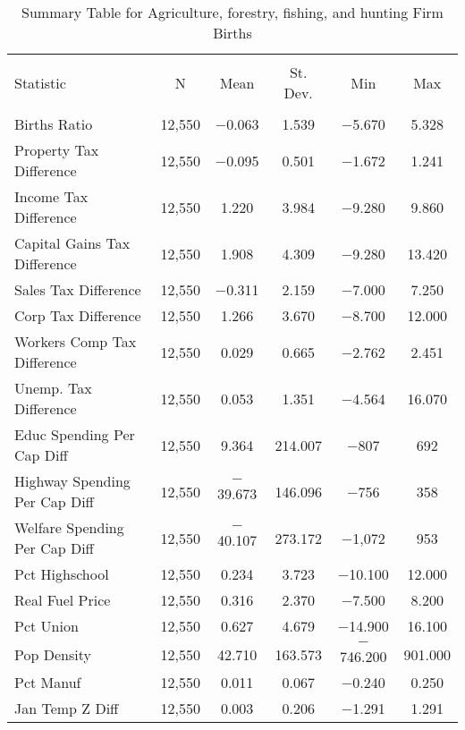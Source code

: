 
\begin{table}[!htbp] \centering 
  \caption{Summary Table for  Agriculture, forestry, fishing, and hunting Firm Births} 
  \label{11summary} 
\begin{tabular}{@{\extracolsep{5pt}}lccccc} 
\\[-1.8ex]\hline 
\hline \\[-1.8ex] 
Statistic & \multicolumn{1}{c}{N} & \multicolumn{1}{c}{Mean} & \multicolumn{1}{c}{St. Dev.} & \multicolumn{1}{c}{Min} & \multicolumn{1}{c}{Max} \\ 
\hline \\[-1.8ex] 
Births Ratio & 12,550 & $-$0.063 & 1.539 & $-$5.670 & 5.328 \\ 
Property Tax Difference & 12,550 & $-$0.095 & 0.501 & $-$1.672 & 1.241 \\ 
Income Tax Difference & 12,550 & 1.220 & 3.984 & $-$9.280 & 9.860 \\ 
Capital Gains Tax Difference & 12,550 & 1.908 & 4.309 & $-$9.280 & 13.420 \\ 
Sales Tax Difference & 12,550 & $-$0.311 & 2.159 & $-$7.000 & 7.250 \\ 
Corp Tax Difference & 12,550 & 1.266 & 3.670 & $-$8.700 & 12.000 \\ 
Workers Comp Tax Difference & 12,550 & 0.029 & 0.665 & $-$2.762 & 2.451 \\ 
Unemp. Tax Difference & 12,550 & 0.053 & 1.351 & $-$4.564 & 16.070 \\ 
Educ Spending Per Cap Diff & 12,550 & 9.364 & 214.007 & $-$807 & 692 \\ 
Highway Spending Per Cap Diff & 12,550 & $-$39.673 & 146.096 & $-$756 & 358 \\ 
Welfare Spending Per Cap Diff & 12,550 & $-$40.107 & 273.172 & $-$1,072 & 953 \\ 
Pct Highschool & 12,550 & 0.234 & 3.723 & $-$10.100 & 12.000 \\ 
Real Fuel Price & 12,550 & 0.316 & 2.370 & $-$7.500 & 8.200 \\ 
Pct Union & 12,550 & 0.627 & 4.679 & $-$14.900 & 16.100 \\ 
Pop Density & 12,550 & 42.710 & 163.573 & $-$746.200 & 901.000 \\ 
Pct Manuf & 12,550 & 0.011 & 0.067 & $-$0.240 & 0.250 \\ 
Jan Temp Z Diff & 12,550 & 0.003 & 0.206 & $-$1.291 & 1.291 \\ 

\end{tabular}
\end{table}
